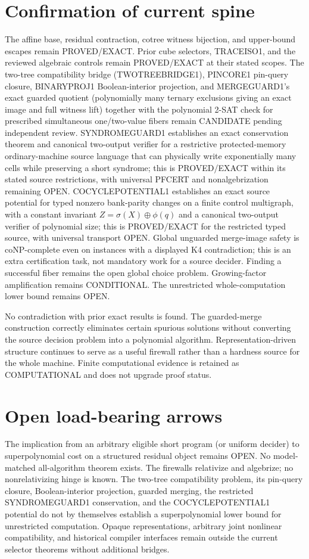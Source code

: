\documentclass[11pt]{article}
\begin{document}
\section{Confirmation of current spine}
The affine base, residual contraction, cotree witness bijection, and upper-bound escapes remain PROVED/EXACT. Prior cube selectors, TRACEISO1, and the reviewed algebraic controls remain PROVED/EXACT at their stated scopes. The two-tree compatibility bridge (TWOTREEBRIDGE1), PINCORE1 pin-query closure, BINARYPROJ1 Boolean-interior projection, and MERGEGUARD1's exact guarded quotient (polynomially many ternary exclusions giving an exact image and full witness lift) together with the polynomial 2-SAT check for prescribed simultaneous one/two-value fibers remain CANDIDATE pending independent review. SYNDROMEGUARD1 establishes an exact conservation theorem and canonical two-output verifier for a restrictive protected-memory ordinary-machine source language that can physically write exponentially many cells while preserving a short syndrome; this is PROVED/EXACT within its stated source restrictions, with universal PFCERT and nonalgebrization remaining OPEN. COCYCLEPOTENTIAL1 establishes an exact source potential for typed nonzero bank-parity changes on a finite control multigraph, with a constant invariant $Z=\sigma(X)\oplus\phi(q)$ and a canonical two-output verifier of polynomial size; this is PROVED/EXACT for the restricted typed source, with universal transport OPEN. Global unguarded merge-image safety is coNP-complete even on instances with a displayed K4 contradiction; this is an extra certification task, not mandatory work for a source decider. Finding a successful fiber remains the open global choice problem. Growing-factor amplification remains CONDITIONAL. The unrestricted whole-computation lower bound remains OPEN.

No contradiction with prior exact results is found. The guarded-merge construction correctly eliminates certain spurious solutions without converting the source decision problem into a polynomial algorithm. Representation-driven structure continues to serve as a useful firewall rather than a hardness source for the whole machine. Finite computational evidence is retained as COMPUTATIONAL and does not upgrade proof status.

\section{Open load-bearing arrows}
The implication from an arbitrary eligible short program (or uniform decider) to superpolynomial cost on a structured residual object remains OPEN. No model-matched all-algorithm theorem exists. The firewalls relativize and algebrize; no nonrelativizing hinge is known. The two-tree compatibility problem, its pin-query closure, Boolean-interior projection, guarded merging, the restricted SYNDROMEGUARD1 conservation, and the COCYCLEPOTENTIAL1 potential do not by themselves establish a superpolynomial lower bound for unrestricted computation. Opaque representations, arbitrary joint nonlinear compatibility, and historical compiler interfaces remain outside the current selector theorems without additional bridges.
\end{document}
